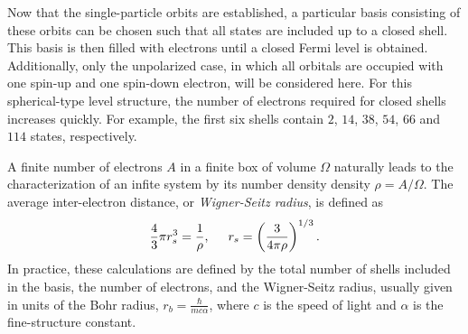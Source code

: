 \documentclass[thesis.tex]{subfiles}
\begin{document}
Now that the single-particle orbits are established, a particular basis consisting of these orbits can be chosen such that all states are included up to a closed shell.  This basis is then filled with electrons until a closed Fermi level is obtained.  Additionally, only the unpolarized case, in which all orbitals are occupied with one spin-up and one spin-down electron, will be considered here.  For this spherical-type level structure, the number of electrons required for closed shells increases quickly.  For example, the first six shells contain $2$, $14$, $38$, $54$, $66$ and $114$ states, respectively.

A finite number of electrons $A$ in a finite box of volume $\Omega$ naturally leads to the characterization of an infite system by its number density density $\rho = A/\Omega$.  The average inter-electron distance, or \textit{Wigner-Seitz radius}, is defined as
\begin{equation} \label{wigner-seitz}
  \frac{4}{3}\pi r_{s}^{3} = \frac{1}{\rho},\hspace{0.5cm} r_{s} = \left(\frac{3}{4\pi\rho}\right)^{1/3}.
\end{equation}
In practice, these calculations are defined by the total number of shells included in the basis, the number of electrons, and the Wigner-Seitz radius, usually given in units of the Bohr radius, $r_{b} = \frac{\hbar}{mc\alpha}$, where $c$ is the speed of light and $\alpha$ is the fine-structure constant.
\end{document}
